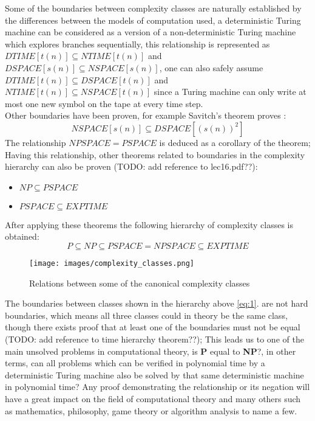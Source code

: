 Some of the boundaries between complexity classes are naturally established by the differences between the models of computation used, a deterministic Turing machine can be considered as a version of a non-deterministic Turing machine which explores branches sequentially, this relationship is represented as $DTIME[t(n)] \subseteq NTIME[t(n)]$ and $DSPACE[s(n)] \subseteq NSPACE[s(n)]$, one can also safely assume $DTIME[t(n)] \subseteq DSPACE[t(n)]$ and $NTIME[t(n)] \subseteq NSPACE[t(n)]$ since a Turing machine can only write at most one new symbol on the tape at every time step.
\\Other boundaries have been proven, for example Savitch's theorem proves \parencite{Savitch1970}:
\begin{equation*}
NSPACE[s(n)] \subseteq DSPACE[(s(n))^2]
\end{equation*}
The relationship $NPSPACE = PSPACE$ is deduced as a corollary of the theorem; Having this relationship, other theorems related to boundaries in the complexity hierarchy can also be proven (TODO: add reference to lec16.pdf??):
\begin{itemize}
	\item $NP \subseteq PSPACE$
	\item $PSPACE \subseteq EXPTIME$
\end{itemize}
After applying these theorems the following hierarchy of complexity classes is obtained:
\begin{equation}
P \subseteq NP \subseteq PSPACE = NPSPACE \subseteq EXPTIME\label{eq:1}
\end{equation}

\begin{figure}[!ht]
	\centering
	\texttt{[image: images/complexity\_classes.png]}
	\caption{ Relations between some of the canonical complexity classes}
	\label{fig:Complexity_classes}
\end{figure}

The boundaries between classes shown in the hierarchy above \eqref{eq:1}. are not hard boundaries, which means all three classes could in theory be the same class, though there exists proof that at least one of the boundaries must not be equal (TODO: add reference to time hierarchy theorem??); This leads us to one of the main unsolved problems in computational theory, is \textbf{P} equal to \textbf{NP}?, in other terms, can all problems which can be verified in polynomial time by a deterministic Turing machine also be solved by that same deterministic machine in polynomial time? Any proof demonstrating the relationship or its negation will have a great impact on the field of computational theory and many others such as mathematics, philosophy, game theory or algorithm analysis to name a few.


